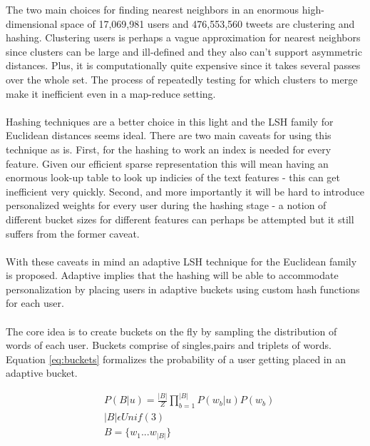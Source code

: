 \documentclass{article}
\begin{document}
The two main choices for finding nearest neighbors in an enormous high-dimensional space
of 17,069,981 users and 476,553,560 tweets are clustering and hashing. Clustering users
is perhaps a vague approximation for nearest neighbors since clusters can be large
and ill-defined and they also can't support asymmetric distances. Plus, it is computationally
quite expensive since it takes several passes over the whole set. The process of repeatedly
testing for which clusters to merge make it inefficient even in a map-reduce setting. \\\\
Hashing techniques are a better choice in this light and the LSH family for Euclidean
distances seems ideal. There are two main caveats for using this technique as is. First, 
for the hashing to work an index is needed for every feature. Given our efficient sparse
representation this will mean having an enormous look-up table to look up indicies of the
text features - this can get inefficient very quickly. Second, and more importantly it
will be hard to introduce personalized weights for every user during the hashing stage -
a notion of different bucket sizes for different features can perhaps be attempted but it
still suffers from the former caveat.\\\\
With these caveats in mind an adaptive LSH technique for the Euclidean family is proposed.
Adaptive implies that the hashing will be able to accommodate personalization by placing 
users in adaptive buckets using custom hash functions for each user.\\\\
The core idea is to create buckets on the fly by sampling the distribution of words of
each user. Buckets comprise of singles,pairs and triplets of words. Equation \ref{eq:buckets}
formalizes the probability of a user getting placed in an adaptive bucket.

\begin{center}
\begin{align}
\label{eq:buckets}
&P(B|u) = \frac{|B|}{Z}\prod_{b=1}^{|B|}P(w_b|u)P(w_b) \\
&|B| \epsilon Unif(3) \\
&B = \{w_1...w_{|B|}\}
\end{align}
\end{center}
\end{document}
